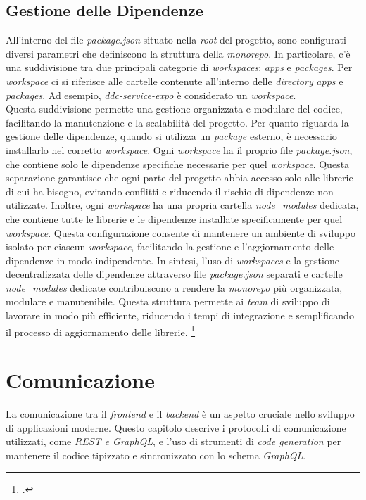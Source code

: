 \subsection{Gestione delle Dipendenze}
All'interno del file \textit{package.json} situato nella \textit{root} del progetto, sono configurati diversi parametri che definiscono la struttura della \textit{monorepo}. 
In particolare, c'è una suddivisione tra due principali categorie di \textit{workspaces}: \textit{apps} e \textit{packages}.
Per \textit{workspace} ci si riferisce alle cartelle contenute all'interno delle \textit{directory} \textit{apps} e \textit{packages}.
Ad esempio, \textit{ddc-service-expo} è considerato un \textit{workspace}.
\\Questa suddivisione permette una gestione organizzata e modulare del codice, facilitando la manutenzione e la scalabilità del progetto.
Per quanto riguarda la gestione delle dipendenze, quando si utilizza un \textit{package} esterno, è necessario installarlo nel corretto \textit{workspace}. 
Ogni \textit{workspace} ha il proprio file \textit{package.json}, che contiene solo le dipendenze specifiche necessarie per quel \textit{workspace}.
Questa separazione garantisce che ogni parte del progetto abbia accesso solo alle librerie di cui ha bisogno, evitando conflitti e riducendo il rischio di dipendenze non utilizzate.
Inoltre, ogni \textit{workspace} ha una propria cartella \textit{node\_modules} dedicata, che contiene tutte le librerie e le dipendenze installate specificamente per quel \textit{workspace}.
Questa configurazione consente di mantenere un ambiente di sviluppo isolato per ciascun \textit{workspace}, facilitando la gestione e l'aggiornamento delle dipendenze in modo indipendente.
In sintesi, l'uso di \textit{workspaces} e la gestione decentralizzata delle dipendenze attraverso file \textit{package.json} separati e cartelle \textit{node\_modules} dedicate contribuiscono a rendere la \textit{monorepo} più organizzata, modulare e manutenibile.
Questa struttura permette ai \textit{team} di sviluppo di lavorare in modo più efficiente, riducendo i tempi di integrazione e semplificando il processo di aggiornamento delle librerie.
\footcite{site:monorepomigration}
\pagebreak

\section{Comunicazione}
\label{sec:comunicazione}

La comunicazione tra il \textit{frontend} e il \textit{backend} è un aspetto cruciale nello sviluppo di applicazioni moderne.
Questo capitolo descrive i protocolli di comunicazione utilizzati, come \textit{REST e \textit{GraphQL}}, e l'uso di strumenti di \textit{code generation} per mantenere il codice tipizzato e sincronizzato con lo schema \textit{GraphQL}.

